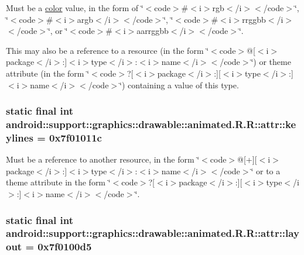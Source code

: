 Must be a \hyperlink{classandroid_1_1support_1_1graphics_1_1drawable_1_1animated_1_1_r_1_1color}{color} value, in the form of \char`\"{}$<$code$>$\#$<$i$>$rgb$<$/i$>$$<$/code$>$\char`\"{}, \char`\"{}$<$code$>$\#$<$i$>$argb$<$/i$>$$<$/code$>$\char`\"{}, \char`\"{}$<$code$>$\#$<$i$>$rrggbb$<$/i$>$$<$/code$>$\char`\"{}, or \char`\"{}$<$code$>$\#$<$i$>$aarrggbb$<$/i$>$$<$/code$>$\char`\"{}. 

This may also be a reference to a resource (in the form \char`\"{}$<$code$>$@\mbox{[}$<$i$>$package$<$/i$>$:\mbox{]}$<$i$>$type$<$/i$>$:$<$i$>$name$<$/i$>$$<$/code$>$\char`\"{}) or theme attribute (in the form \char`\"{}$<$code$>$?\mbox{[}$<$i$>$package$<$/i$>$:\mbox{]}\mbox{[}$<$i$>$type$<$/i$>$:\mbox{]}$<$i$>$name$<$/i$>$$<$/code$>$\char`\"{}) containing a value of this type. \hypertarget{classandroid_1_1support_1_1graphics_1_1drawable_1_1animated_1_1_r_1_1attr_41d8e03485971de44fcef3e78b3d3197}{
\subsubsection[{keylines}]{\setlength{\rightskip}{0pt plus 5cm}static final int android::support::graphics::drawable::animated.R.R::attr::keylines = 0x7f01011c}}
\label{classandroid_1_1support_1_1graphics_1_1drawable_1_1animated_1_1_r_1_1attr_41d8e03485971de44fcef3e78b3d3197}


Must be a reference to another resource, in the form \char`\"{}$<$code$>$@\mbox{[}+\mbox{]}\mbox{[}$<$i$>$package$<$/i$>$:\mbox{]}$<$i$>$type$<$/i$>$:$<$i$>$name$<$/i$>$$<$/code$>$\char`\"{} or to a theme attribute in the form \char`\"{}$<$code$>$?\mbox{[}$<$i$>$package$<$/i$>$:\mbox{]}\mbox{[}$<$i$>$type$<$/i$>$:\mbox{]}$<$i$>$name$<$/i$>$$<$/code$>$\char`\"{}. \hypertarget{classandroid_1_1support_1_1graphics_1_1drawable_1_1animated_1_1_r_1_1attr_023298e2d6c11b95467a1e988039280a}{
\subsubsection[{layout}]{\setlength{\rightskip}{0pt plus 5cm}static final int android::support::graphics::drawable::animated.R.R::attr::layout = 0x7f0100d5}}
\label{classandroid_1_1support_1_1graphics_1_1drawable_1_1animated_1_1_r_1_1attr_023298e2d6c11b95467a1e988039280a}


